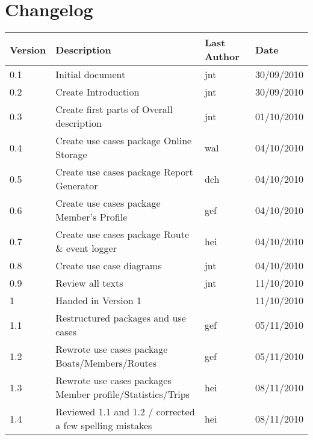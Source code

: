 \section*{Changelog}

\begin{table}[h!]
	\begin{center}
		\begin{tabular}{|l|l|l|l|}
			\hline
			\rowcolor{fontys_pink_light}Version	&Description	&Last Author	&Date\\
			\hline
			0.1	&Initial document	&jnt	&30/09/2010\\
			\hline
			0.2	&Create Introduction	&jnt	&30/09/2010\\
			\hline
			0.3	&Create first parts of Overall description	&jnt	&01/10/2010\\
			\hline
			0.4	&Create use cases package Online Storage&wal	&04/10/2010\\
			\hline
			0.5	&Create use cases package Report Generator	&dch	&04/10/2010\\
			\hline
			0.6	&Create use cases package Member's Profile	&gef	&04/10/2010\\
			\hline
			0.7	&Create use cases package Route \& event logger	&hei	&04/10/2010\\
			\hline
			0.8	&Create use case diagrams	&jnt	&04/10/2010\\
			\hline
			0.9	&Review all texts	&jnt	&11/10/2010\\
			\hline
			\rowcolor{fontysgreen2}1	& Handed in Version 1 & &11/10/2010\\
			\hline
			1.1	&Restructured packages and use cases	&gef	&05/11/2010\\
			\hline
			1.2	&Rewrote use cases package Boats/Members/Routes	&gef	&05/11/2010\\
			\hline
			1.3	&Rewrote use cases packages Member profile/Statistics/Trips 	&hei	&08/11/2010\\
			\hline
			1.4	&Reviewed 1.1 and 1.2 / corrected a few spelling mistakes &hei	&08/11/2010\\

		\hline
		\end{tabular}
	\end{center}
	\label{tab:changelog}
\end{table}
